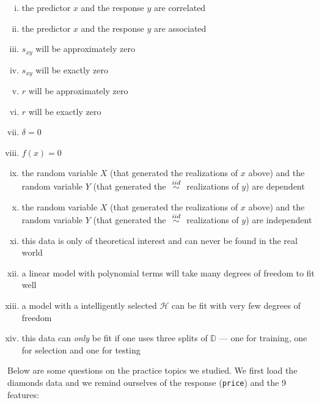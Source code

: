 \documentclass[12pt]{article}
\begin{document}
\begin{enumerate}[i)]
\item the predictor $x$ and the response $y$ are correlated
\item the predictor $x$ and the response $y$ are associated
\item $s_{xy}$ will be approximately zero
\item $s_{xy}$ will be exactly zero
\item $r$ will be approximately zero
\item $r$ will be exactly zero
\item $\delta = 0$
\item $f(x) = 0$
\item the random variable $X$ (that generated the realizations of $x$ above) and the random variable $Y$ (that generated the $\iid$ realizations of $y$) are dependent
\item the random variable $X$ (that generated the realizations of $x$ above) and the random variable $Y$ (that generated the $\iid$ realizations of $y$) are independent
\item this data is only of theoretical interest and can never be found in the real world
\item a linear model with polynomial terms will take many degrees of freedom to fit well
\item a model with a intelligently selected $\mathcal{H}$ can be fit with very few degrees of freedom
\item this data can \textit{only} be fit if one uses three splits of $\mathbb{D}$ --- one for training, one for selection and one for testing
\end{enumerate}

\eenum
\pagebreak



\problem Below are some questions on the practice topics we studied. We first load the diamonds data and we remind ourselves of the response (\texttt{price}) and the 9 features:
\end{document}
